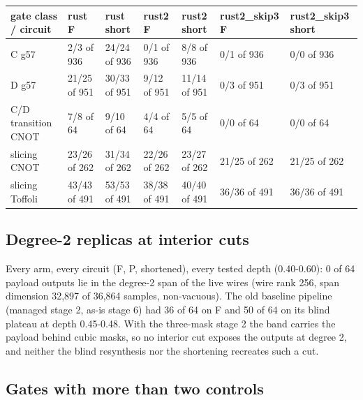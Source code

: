 \documentclass[10pt,a4paper]{article}
\begin{document}
{\small\setlength{\tabcolsep}{2pt}\begin{longtable}{|p{2.69cm}|p{1.98cm}|p{1.98cm}|p{1.98cm}|p{1.98cm}|p{2.07cm}|p{2.44cm}|}\hline
\textbf{gate class /\allowbreak{} circuit} & \textbf{rust F} & \textbf{rust short} & \textbf{rust2 F} & \textbf{rust2 short} & \textbf{rust2\_skip3 F} & \textbf{rust2\_skip3 short}\\\hline\endhead
C g57 & 2/\allowbreak{}3 of 936 & 24/\allowbreak{}24 of 936 & 0/\allowbreak{}1 of 936 & 8/\allowbreak{}8 of 936 & 0/\allowbreak{}1 of 936 & 0/\allowbreak{}0 of 936\\\hline
D g57 & 21/\allowbreak{}25 of 951 & 30/\allowbreak{}33 of 951 & 9/\allowbreak{}12 of 951 & 11/\allowbreak{}14 of 951 & 0/\allowbreak{}3 of 951 & 0/\allowbreak{}3 of 951\\\hline
C/\allowbreak{}D transition CNOT & 7/\allowbreak{}8 of 64 & 9/\allowbreak{}10 of 64 & 4/\allowbreak{}4 of 64 & 5/\allowbreak{}5 of 64 & 0/\allowbreak{}0 of 64 & 0/\allowbreak{}0 of 64\\\hline
slicing CNOT & 23/\allowbreak{}26 of 262 & 31/\allowbreak{}34 of 262 & 22/\allowbreak{}26 of 262 & 23/\allowbreak{}27 of 262 & 21/\allowbreak{}25 of 262 & 21/\allowbreak{}25 of 262\\\hline
slicing Toffoli & 43/\allowbreak{}43 of 491 & 53/\allowbreak{}53 of 491 & 38/\allowbreak{}38 of 491 & 40/\allowbreak{}40 of 491 & 36/\allowbreak{}36 of 491 & 36/\allowbreak{}36 of 491\\\hline
\end{longtable}}

\subsection{Degree-2 replicas at interior cuts}

Every arm, every circuit (F, P, shortened), every tested depth (0.40-0.60): 0 of 64 payload outputs lie in the degree-2 span of the live wires (wire rank 256, span dimension 32,897 of 36,864 samples, non-vacuous). The old baseline pipeline (managed stage 2, as-is stage 6) had 36 of 64 on F and 50 of 64 on its blind plateau at depth 0.45-0.48. With the three-mask stage 2 the band carries the payload behind cubic masks, so no interior cut exposes the outputs at degree 2, and neither the blind resynthesis nor the shortening recreates such a cut.

\subsection{Gates with more than two controls}
\end{document}
